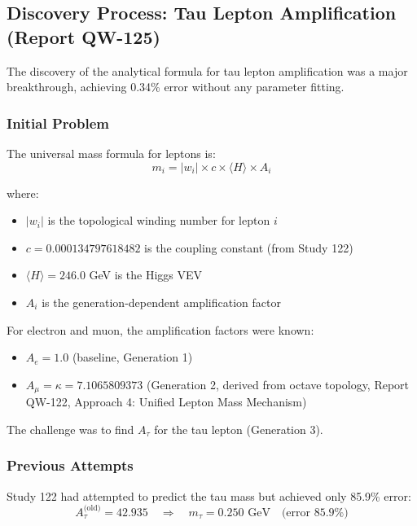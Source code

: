 \documentclass[11pt, a4paper]{article}
\begin{document}
\subsection{Discovery Process: Tau Lepton Amplification (Report QW-125)}

The discovery of the analytical formula for tau lepton amplification was a major breakthrough, achieving 0.34\% error without any parameter fitting.

\subsubsection{Initial Problem}

The universal mass formula for leptons is:
\begin{equation}
m_i = |w_i| \times c \times \langle H \rangle \times A_i
\end{equation}

where:
\begin{itemize}
    \item $|w_i|$ is the topological winding number for lepton $i$
    \item $c = 0.000134797618482$ is the coupling constant (from Study 122)
    \item $\langle H \rangle = 246.0$ GeV is the Higgs VEV
    \item $A_i$ is the generation-dependent amplification factor
\end{itemize}

For electron and muon, the amplification factors were known:
\begin{itemize}
    \item $A_e = 1.0$ (baseline, Generation 1)
    \item $A_\mu = \kappa = 7.1065809373$ (Generation 2, derived from octave topology, Report QW-122, Approach 4: Unified Lepton Mass Mechanism)
\end{itemize}

The challenge was to find $A_\tau$ for the tau lepton (Generation 3).

\subsubsection{Previous Attempts}

Study 122 had attempted to predict the tau mass but achieved only 85.9\% error:
\begin{equation}
A_\tau^{\text{(old)}} = 42.935 \quad \Rightarrow \quad m_\tau = 0.250 \text{ GeV} \quad \text{(error 85.9\%)}
\end{equation}
\end{document}
